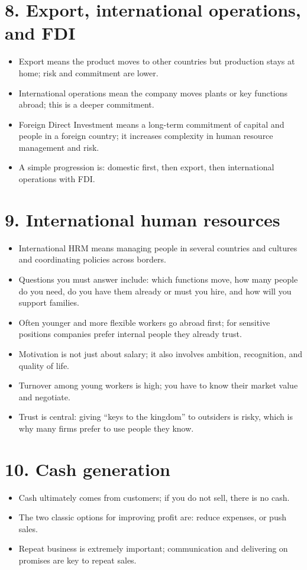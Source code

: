 \documentclass[10pt,a4paper]{article}
\begin{document}
\section*{8. Export, international operations, and FDI}
\begin{itemize}
\item Export means the product moves to other countries but production stays at home; risk and commitment are lower.
\item International operations mean the company moves plants or key functions abroad; this is a deeper commitment.
\item Foreign Direct Investment means a long-term commitment of capital and people in a foreign country; it increases complexity in human resource management and risk.
\item A simple progression is: domestic first, then export, then international operations with FDI.
\end{itemize}

\section*{9. International human resources}
\begin{itemize}
\item International HRM means managing people in several countries and cultures and coordinating policies across borders.
\item Questions you must answer include: which functions move, how many people do you need, do you have them already or must you hire, and how will you support families.
\item Often younger and more flexible workers go abroad first; for sensitive positions companies prefer internal people they already trust.
\item Motivation is not just about salary; it also involves ambition, recognition, and quality of life.
\item Turnover among young workers is high; you have to know their market value and negotiate.
\item Trust is central: giving “keys to the kingdom” to outsiders is risky, which is why many firms prefer to use people they know.
\end{itemize}

\section*{10. Cash generation}
\begin{itemize}
\item Cash ultimately comes from customers; if you do not sell, there is no cash.
\item The two classic options for improving profit are: reduce expenses, or push sales.
\item Repeat business is extremely important; communication and delivering on promises are key to repeat sales.
\end{itemize}
\end{document}
